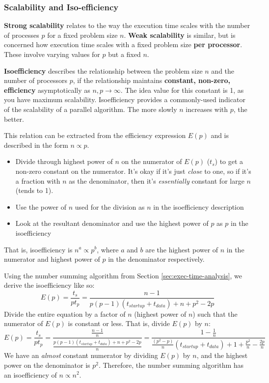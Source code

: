 \documentclass{article}
\begin{document}
\subsubsection{Scalability and Iso-efficiency}

\textbf{Strong scalability} relates to the way the execution time scales with the number of processes $p$ for a fixed problem size $n$. \textbf{Weak scalability} is similar, but is concerned how execution time scales with a fixed problem size \textbf{per processor}. These involve varying values for $p$ but a fixed $n$.

\textbf{Isoefficiency} describes the relationship between the problem size $n$ and the number of processors $p$, if the relationship maintains \textbf{constant, non-zero, efficiency} asymptotically as $n,p \rightarrow \infty$. The idea value for this constant is 1, as you have maximum scalability. Isoefficiency provides a commonly-used indicator of the scalability of a parallel algorithm. The more slowly $n$ increases with $p$, the better.

This relation can be extracted from the efficiency expression $E(p)$ and is described in the form $n \propto p$.
\begin{itemize}
	\item Divide through highest power of $n$ on the numerator of $E(p)$ ($t_s$) to get a non-zero constant on the numerator. It's okay if it's just \textit{close} to one, so if it's a fraction with $n$ as the denominator, then it's \textit{essentially} constant for large $n$ (tends to 1).
	\item Use the power of $n$ used for the division as $n$ in the isoefficiency description
	\item Look at the resultant denominator and use the highest power of $p$ as $p$ in the isoefficiency
\end{itemize}
That is, isoefficiency is $n^{a} \propto p^{b}$, where $a$ and $b$ are the highest power of $n$ in the numerator and highest power of $p$ in the denominator respectively.

Using the number summing algorithm from Section \ref{sec:exec-time-analysis}, we derive the isoefficiency like so:
\begin{equation}
	E(p) = \frac{t_s}{pt_p} = \frac{n - 1}{p(p - 1)(t_{startup} + t_{data}) + n + p^2 - 2p}
\end{equation}
Divide the entire equation by a factor of $n$ (highest power of $n$) such that the numerator of $E(p)$ is constant or less. That is, divide $E(p)$ by $n$:
\begin{equation}
	E(p) = \frac{t_s}{pt_p} = \frac{\frac{n - 1}{n}}{\frac{p(p - 1)(t_{startup} + t_{data}) + n + p^2 - 2p}{n}} = \frac{1 - \frac{1}{n}}{\frac{(p^2 - p)}{n}(t_{startup} + t_{data}) + 1 + \frac{p^2}{n} - \frac{2p}{n} }
\end{equation}
We have an \textit{almost} constant numerator by dividing $E(p)$ by $n$, and the highest power on the denominator is $p^2$. Therefore, the number summing algorithm has an isoefficiency of $n \propto n^2$.
\end{document}
